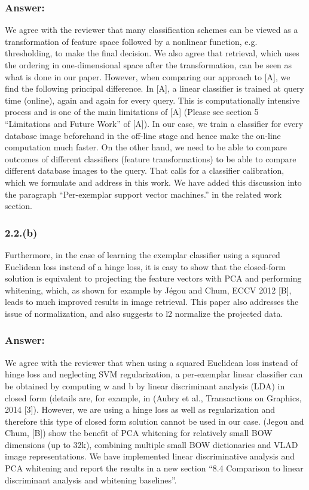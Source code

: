 \documentclass[a4paper,12pt]{article}
\begin{document}
\subsubsection*{Answer:}
We agree with the reviewer that many classification schemes can be viewed as a transformation of feature space followed by a nonlinear function, e.g. thresholding, to make the final decision. We also agree that retrieval, which uses the ordering in  one-dimensional space after the transformation, can be seen as what is done in our paper. However, when comparing our approach to [A], we find the following principal difference. In [A], a linear classifier is trained at query time (online), again and again for every query. This is computationally intensive process and is one of the main limitations of [A] (Please see section 5 “Limitations and Future Work” of [A]). In our case, we train a classifier for every database image beforehand in the off-line stage and hence make the on-line computation much faster. On the other hand, we need to be able to compare outcomes of different classifiers (feature transformations) to be able to compare different database images to the query. That calls for a classifier calibration, which we formulate and address in this work. We have added this discussion into the paragraph “Per-exemplar support vector machines.” in the related work section.

\subsubsection*{2.2.(b)}
Furthermore, in the case of learning the exemplar classifier using a squared Euclidean loss instead of a hinge loss, it is easy to show that the closed-form solution is equivalent to projecting the feature vectors with PCA and performing whitening, which, as shown for example by Jégou and Chum, ECCV 2012 [B], leads to much improved results in image retrieval. This paper also addresses the issue of normalization, and also suggests to l2 normalize the projected data.

\subsubsection*{Answer:}
We agree with the reviewer that when using a squared Euclidean loss instead of hinge loss and neglecting SVM regularization, a per-exemplar linear classifier can be obtained by computing w and b by linear discriminant analysis (LDA) in closed form (details are, for example, in (Aubry et al., Transactions on Graphics, 2014 [3]). However, we are using a hinge loss as well as regularization and therefore this type of closed form solution cannot be used in our case.   (Jegou and Chum, [B]) show the benefit of PCA whitening for relatively small BOW dimensions (up to 32k), combining multiple small BOW dictionaries and VLAD image representations. We have implemented linear discriminative analysis and PCA whitening and report the results in a new section “8.4 Comparison to linear discriminant analysis and whitening baselines”.
\end{document}

